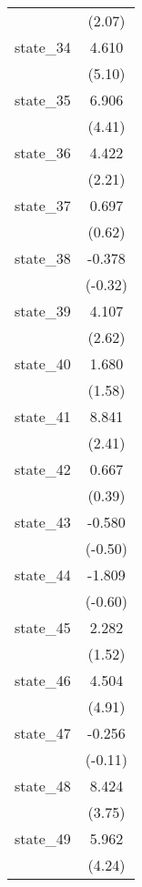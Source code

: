 {\begin{tabular}{l*{1}{c}}
            &      (2.07)         \\
[1em]
state\_34    &       4.610\sym{***}\\
            &      (5.10)         \\
[1em]
state\_35    &       6.906\sym{***}\\
            &      (4.41)         \\
[1em]
state\_36    &       4.422\sym{*}  \\
            &      (2.21)         \\
[1em]
state\_37    &       0.697         \\
            &      (0.62)         \\
[1em]
state\_38    &      -0.378         \\
            &     (-0.32)         \\
[1em]
state\_39    &       4.107\sym{**} \\
            &      (2.62)         \\
[1em]
state\_40    &       1.680         \\
            &      (1.58)         \\
[1em]
state\_41    &       8.841\sym{*}  \\
            &      (2.41)         \\
[1em]
state\_42    &       0.667         \\
            &      (0.39)         \\
[1em]
state\_43    &      -0.580         \\
            &     (-0.50)         \\
[1em]
state\_44    &      -1.809         \\
            &     (-0.60)         \\
[1em]
state\_45    &       2.282         \\
            &      (1.52)         \\
[1em]
state\_46    &       4.504\sym{***}\\
            &      (4.91)         \\
[1em]
state\_47    &      -0.256         \\
            &     (-0.11)         \\
[1em]
state\_48    &       8.424\sym{***}\\
            &      (3.75)         \\
[1em]
state\_49    &       5.962\sym{***}\\
            &      (4.24)         \\

\end{tabular}}
